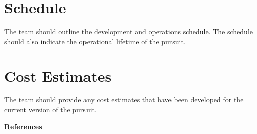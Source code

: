 \documentclass[12pt]{article}
\begin{document}
\section{Schedule} 
\color{blue}
The team should outline the development and operations schedule. The schedule should also indicate the operational lifetime of the pursuit.
\color{black}

\section{Cost Estimates}
\color{blue}
 The team should provide any cost estimates that have been developed for the current version of the pursuit. 
 \color{black}

\pagebreak
\textbf{References}
\end{document}
